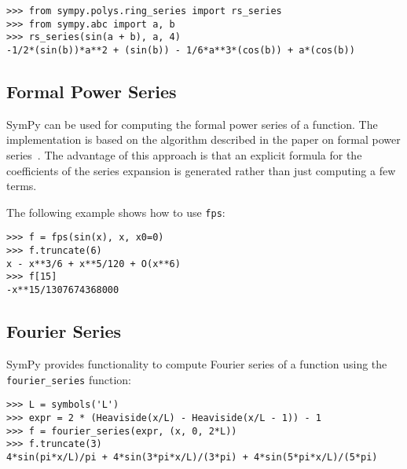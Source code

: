 \begin{verbatim}
>>> from sympy.polys.ring_series import rs_series
>>> from sympy.abc import a, b
>>> rs_series(sin(a + b), a, 4)
-1/2*(sin(b))*a**2 + (sin(b)) - 1/6*a**3*(cos(b)) + a*(cos(b))
\end{verbatim}

\subsection{Formal Power Series}

SymPy can be used for computing the formal power series of a function.
The implementation is based on the algorithm described in the paper on
formal power series~\cite{Gruntz93formalpower}.  The advantage of this approach is
that an explicit formula for the coefficients of the series expansion is generated
rather than just computing a few terms.

The following example shows how to use \texttt{fps}:

\begin{verbatim}
>>> f = fps(sin(x), x, x0=0)
>>> f.truncate(6)
x - x**3/6 + x**5/120 + O(x**6)
>>> f[15]
-x**15/1307674368000
\end{verbatim}

\subsection{Fourier Series}

SymPy provides functionality to compute Fourier series of a function using the
\texttt{fourier\_series} function:

\begin{verbatim}
>>> L = symbols('L')
>>> expr = 2 * (Heaviside(x/L) - Heaviside(x/L - 1)) - 1
>>> f = fourier_series(expr, (x, 0, 2*L))
>>> f.truncate(3)
4*sin(pi*x/L)/pi + 4*sin(3*pi*x/L)/(3*pi) + 4*sin(5*pi*x/L)/(5*pi)
\end{verbatim}
